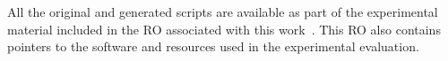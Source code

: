 All the original and generated scripts are available as part of the experimental material 
included in the RO associated with this 
work~\cite{fgcs-2015-object}. This RO also contains pointers to the software and resources 
used in the experimental evaluation.


%
%
%
%
